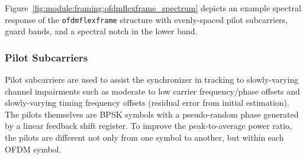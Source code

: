 %
Figure~\ref{fig:module:framing:ofdmflexframe_spectrum} depicts an
example spectral response of the {\tt ofdmflexframe} structure
with evenly-spaced pilot subcarriers, guard bands, and a spectral notch
in the lower band.


\subsubsection{Pilot Subcarriers}
\label{module:framing:ofdmflexframe:pilots}
Pilot subcarriers are used to assist the synchronizer in tracking to
slowly-varying channel impairments such as
moderate to low carrier frequency/phase offsets
and slowly-varying timing frequency offsets
(residual error from initial estimation).
The pilots themselves are BPSK symbols with a pseudo-random phase
generated by a linear feedback shift register. %
To improve the peak-to-average power ratio, the pilots are different not
only from one symbol to another, but within each OFDM symbol.



